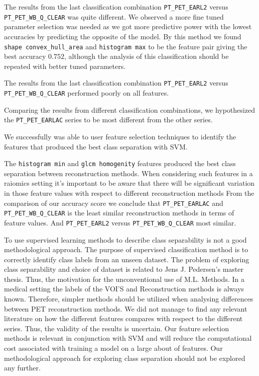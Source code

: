 The results from the last classification combination
 \verb|PT_PET_EARL2| versus \verb|PT_PET_WB_Q_CLEAR| was quite different. 
 We observed a more fine tuned 
 parameter selection was needed as we got more predictive power with the lowest accuracies by predicting the 
 opposite of the model. By this method we found \verb|shape convex_hull_area| and \verb|histogram max| 
 to be the feature pair giving the best accuracy $0.752$, although the analysis of this classification 
 should be repeated with better tuned parameters. 

The results from the last classification combination
 \verb|PT_PET_EARL2| versus \verb|PT_PET_WB_Q_CLEAR| performed poorly on all
 features. 

 Comparing the results from different classification combinations, we hypothesized the \verb|PT_PET_EARLAC| 
 series to be most different from the other series. 


 We successfully was able to user feature selection techniques to identify the
 features that produced the best class separation with SVM.     

The \verb|histogram min| and \verb|glcm homogenity| features produced the best
class separation between reconstruction methods.     
When considering such features in a raiomics setting it's important to be
aware that there will be significant variation in those feature values with
respect to different reconstruction methods
From the comparison of our accuracy score we conclude that    
\verb|PT_PET_EARLAC| and \verb|PT_PET_WB_Q_CLEAR|
is the least similar reconstruction methods  in terms of feature values.   
And \verb|PT_PET_EARL2| versus \verb|PT_PET_WB_Q_CLEAR| most similar. 


To use supervised learning methods to describe class separability is not a
good methodological approach. The purpose of supervised classification
method is to correctly identify class labels from an unseen dataset.     
The problem of exploring class separability and choice of dataset is
related to Jens J. Pedersen's master thesis. Thus, the motivation for the 
unconventional use of M.L. Methods. In a medical setting the labels of the
VOI'S and Reconstruction methods is always known. Therefore, simpler methods
should be utilized when analysing differences between PET reconstruction
methods. We did not manage to find any relevant literature on how the different features compares
with respect to the different series. Thus, the validity of the results is
uncertain. Our feature selection methods is relevant in conjunction with SVM and
will reduce the computational cost associated with training a model on a large
about of features. Our methodological approach for exploring class separation
should not be explored any further. 
 




% 

